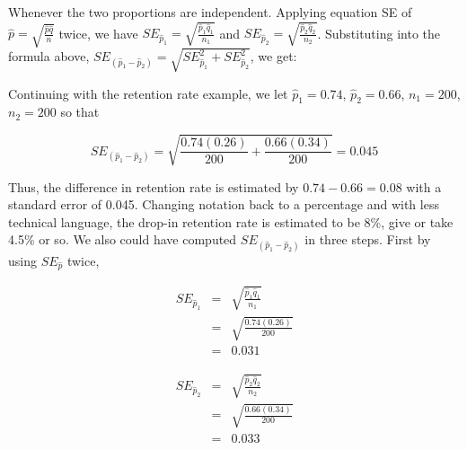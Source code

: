 \documentclass[11pt, chapterprefix=true]{scrbook}\usepackage[]{graphicx}\usepackage[]{color}
\begin{document}
Whenever the two proportions are independent.  Applying equation SE of $\hat{p} = \sqrt{ \frac{ \hat{p} \hat{q} }{n}}$ twice, we have $SE_{\hat{p}_1} = \sqrt{ \frac{ \hat{p}_1 \hat{q}_1 }{n_1}}$ and $SE_{\hat{p}_2} = \sqrt{ \frac{ \hat{p}_2 \hat{q}_2 }{n_2}}$.  Substituting into the formula above, $SE_{(\hat{p}_1 - \hat{p}_2)} = \sqrt{ SE_{\hat{p}_1}^2 + SE_{\hat{p}_2}^2}$, we get:


Continuing with the retention rate example, we let $\hat{p}_1 = 0.74$, $\hat{p}_2 = 0.66$, $n_1 = 200$, $n_2 = 200$ so that

$$ SE_{( \hat{p}_1 - \hat{p}_2)} = \sqrt{ \frac{ 0.74 (0.26)}{200} + \frac{ 0.66 (0.34) }{200}} = 0.045 $$

Thus, the difference in retention rate is estimated by $0.74 - 0.66 = 0.08$ with a standard error of 0.045.  Changing notation back to a percentage and with less technical language, the drop-in retention rate is estimated to be 8\%, give or take 4.5\% or so. We also could have computed $ SE_{( \hat{p}_1 - \hat{p}_2)}$  in three steps.  First by using $SE_{\hat{p}}$ twice,

\begin{minipage}[ht]{7cm}

\begin{eqnarray*}
  SE_{\hat{p}_1} &=& \sqrt{ \frac{\hat{p}_1 \hat{q}_1}{n_1}} \\
  &=& \sqrt{ \frac{0.74  (0.26)}{200}} \\
  &=& 0.031
\end{eqnarray*} 

\end{minipage}
\begin{minipage}[ht]{7cm}

\begin{eqnarray*}
  SE_{\hat{p}_2} &=& \sqrt{ \frac{\hat{p}_2 \hat{q}_2}{n_2}} \\ 
  &=& \sqrt{ \frac{0.66  (0.34)}{200}} \\
  &=& 0.033
\end{eqnarray*}  

\end{minipage}
\end{document}
